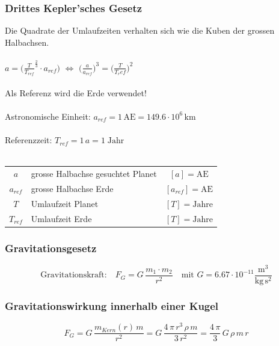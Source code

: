 		\subsubsection{Drittes Kepler'sches Gesetz}
			Die Quadrate der Umlaufzeiten verhalten sich wie die Kuben der grossen Halbachsen. \\
			\\
			$a = \big(  \frac{T}{T_{ref}}^{\frac{2}{3}} \cdot a_{ref} \big)$ \qquad $\Leftrightarrow$ \qquad $\big( \frac{a}{a_{ref}}  \big)^3 =  \big( \frac{T}{T_ref}  \big)^2 $ \\
			\\
			Als Referenz wird die Erde verwendet! \\
			\\
			Astronomische Einheit: $a_{ref} = 1 \, \mathrm{AE} = 149.6 \cdot 10^6 \, \mathrm{km}$ \\
			\\
			Referenzzeit: $T_{ref} = 1 \, a = 1 \; \mathrm{Jahr}$ \\
			\\
			\begin{tabular}{c l c}
				$a$ & grosse Halbachse gesuchtet Planet & $[a] = \mathrm{AE}$ \\
				$a_{ref}$ &  grosse Halbachse Erde & $[a_{ref}] = \mathrm{AE}$ \\	
				$T$ & Umlaufzeit Planet & $[T] = \mathrm{Jahre}$ \\
				$T_{ref}$ & Umlaufzeit Erde & $[T] = \mathrm{Jahre}$ \\
			\end{tabular}

		\subsubsection{Gravitationsgesetz}
		
			$$ \boxed{ \text{Gravitationskraft:}  \quad F_G = G \, \frac{m_1 \cdot m_2}{r^2} \quad \text{mit }G = 6.67 \cdot 10^{-11} \mathrm{\frac{m^3}{kg \, s^2}} }$$ 

		\subsubsection{Gravitationswirkung innerhalb einer Kugel}
		
			$$ \boxed{ F_G = G \, \frac{m_{Kern} (r) \, m}{r^2} =  G \, \frac{4 \, \pi \, r^3 \, \rho \, m}{3 \, r^2} = \frac{4 \, \pi}{3} \, G \, \rho \, m \, r } $$ \\
		
